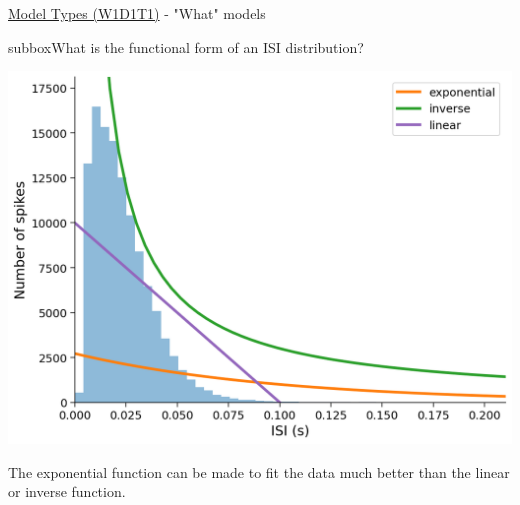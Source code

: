 \begin{textbox}{\href{https://compneuro.neuromatch.io/tutorials/W1D1_ModelTypes/student/W1D1_Tutorial1.html}{Model Types (W1D1T1)} -  "What" models}
\begin{subbox}{subbox}{What is the functional form of an ISI distribution?}
\begin{center}
\includegraphics[scale=0.15]{Figures/MT/MT_Figure4.png}
\end{center}
The exponential function can be made to fit the data much better than the linear
or inverse function.
\end{subbox}
\end{textbox}
